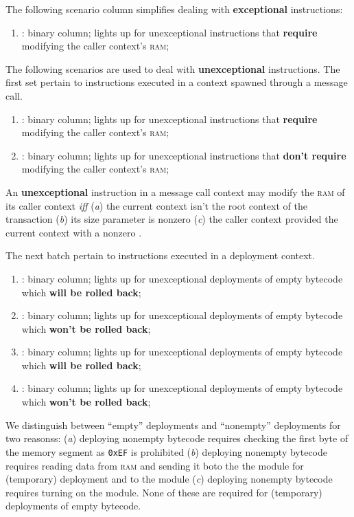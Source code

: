 The following scenario column simplifies dealing with \textbf{exceptional}  instructions: 
\begin{enumerate}[resume]
	\item \scenReturnException:
		binary column;
		lights up for unexceptional  instructions that \textbf{require} modifying the caller context's \textsc{ram};
\end{enumerate}
The following scenarios are used to deal with \textbf{unexceptional}  instructions.
The first set pertain to  instructions executed in a context spawned through a message call.
\begin{enumerate}[resume]
	\item \scenReturnFromMessageCallWillTouchRam:
		binary column;
		lights up for unexceptional  instructions that \textbf{require} modifying the caller context's \textsc{ram};
	\item \scenReturnFromMessageCallWontTouchRam:
		binary column;
		lights up for unexceptional  instructions that \textbf{don't require} modifying the caller context's \textsc{ram};
\end{enumerate}
\saNote{} An \textbf{unexceptional}  instruction in a message call context may modify the \textsc{ram} of its caller context \emph{iff}
(\emph{a}) the current context isn't the root context of the transaction
(\emph{b}) its size parameter is nonzero
(\emph{c}) the caller context provided the current context with a nonzero \rac{}.

The next batch pertain to  instructions executed in a deployment context.
\begin{enumerate}[resume]
	\item \scenReturnFromDeploymentEmptyByteCodeWillRevert:
		binary column;
		lights up for unexceptional  deployments of empty bytecode which \textbf{will be rolled back};
	\item \scenReturnFromDeploymentEmptyByteCodeWontRevert:
		binary column;
		lights up for unexceptional  deployments of empty bytecode which \textbf{won't be rolled back};
	\item \scenReturnFromDeploymentNonemptyByteCodeWillRevert:
		binary column;
		lights up for unexceptional  deployments of empty bytecode which \textbf{will be rolled back};
	\item \scenReturnFromDeploymentNonemptyByteCodeWontRevert:
		binary column;
		lights up for unexceptional  deployments of empty bytecode which \textbf{won't be rolled back};
\end{enumerate}
\saNote{} We distinguish between ``empty'' deployments and ``nonempty'' deployments for two reasonss:
(\emph{a}) deploying nonempty bytecode requires checking the first byte of the memory segment as \texttt{0xEF} is prohibited
(\emph{b}) deploying nonempty bytecode requires reading data from \textsc{ram} and sending it boto the the \romMod{} module for (temporary) deployment and to the \hashDataMod{} module
(\emph{c}) deploying nonempty bytecode requires turning on the \hashInfoMod{} module.
None of these are required for (temporary) deployments of empty bytecode.
